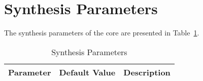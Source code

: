 \section{Synthesis Parameters}
\label{sec:sp}

The synthesis parameters of the core are presented in Table~\ref{tab:sp}.

\begin{table}[H]
  \centering
    \begin{tabularx}{\textwidth}{ | c | c | X | }
    \hline
    \rowcolor{iob-green}
    {\bf Parameter} & {\bf Default Value} & {\bf Description} \\\hline

    

    \end{tabularx}
  \caption{Synthesis Parameters}
  \label{tab:sp}
\end{table}
